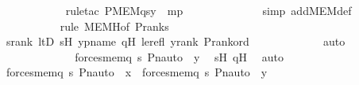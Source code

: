 \begin{isabellebody}
\ \ \ \ \ \ \ \ \ \ \isamarkupfalse%
\ {\isacharparenleft}{\kern0pt}rule{\isacharunderscore}{\kern0pt}tac\ P{\isacharequal}{\kern0pt}{\isachardoublequoteopen}MEM{\isacharparenleft}{\kern0pt}q{\isacharcomma}{\kern0pt}s{\isacharcomma}{\kern0pt}y{\isacharparenright}{\kern0pt}{\isachardoublequoteclose}\ \ mp{\isacharparenright}{\kern0pt}\ \isanewline
\ \ \ \ \ \ \ \ \ \ \ \isamarkupfalse%
\ {\isacharparenleft}{\kern0pt}simp\ add{\isacharcolon}{\kern0pt}MEM{\isacharunderscore}{\kern0pt}def{\isacharparenright}{\kern0pt}\ \isanewline
\ \ \ \ \ \ \ \ \ \ \isamarkupfalse%
{\isacharparenleft}{\kern0pt}rule\ MEMH{\isacharbrackleft}{\kern0pt}of\ {\isachardoublequoteopen}P{\isacharunderscore}{\kern0pt}rank{\isacharparenleft}{\kern0pt}s{\isacharparenright}{\kern0pt}{\isachardoublequoteclose}{\isacharbrackright}{\kern0pt}{\isacharparenright}{\kern0pt}\ \isanewline
\ \ \ \ \ \ \ \ \ \ \isamarkupfalse%
\ srank\ ltD\ sH\ ypname\ qH\ le{\isacharunderscore}{\kern0pt}refl\ yrank\ P{\isacharunderscore}{\kern0pt}rank{\isacharunderscore}{\kern0pt}ord\ \isanewline
\ \ \ \ \ \ \ \ \ \ \isamarkupfalse%
\ auto\ \ \isanewline
\ \ \ \ \ \ \ \ \isamarkupfalse%
\ \isamarkupfalse%
\ {\isachardoublequoteopen}{\isachardot}{\kern0pt}{\isachardot}{\kern0pt}{\isachardot}{\kern0pt}\ {\isasymlongleftrightarrow}\ forces{\isacharunderscore}{\kern0pt}mem{\isacharparenleft}{\kern0pt}q{\isacharprime}{\kern0pt}{\isacharcomma}{\kern0pt}\ s{\isacharprime}{\kern0pt}{\isacharcomma}{\kern0pt}\ Pn{\isacharunderscore}{\kern0pt}auto{\isacharparenleft}{\kern0pt}{\isasympi}{\isacharparenright}{\kern0pt}\ {\isacharbackquote}{\kern0pt}\ y{\isacharparenright}{\kern0pt}{\isachardoublequoteclose}\ \isamarkupfalse%
\ sH\ qH\ \isamarkupfalse%
\ auto\isanewline
\ \ \ \ \ \ \ \ \isamarkupfalse%
\ \isamarkupfalse%
\ {\isachardoublequoteopen}forces{\isacharunderscore}{\kern0pt}mem{\isacharparenleft}{\kern0pt}q{\isacharprime}{\kern0pt}{\isacharcomma}{\kern0pt}\ s{\isacharprime}{\kern0pt}{\isacharcomma}{\kern0pt}\ Pn{\isacharunderscore}{\kern0pt}auto{\isacharparenleft}{\kern0pt}{\isasympi}{\isacharparenright}{\kern0pt}\ {\isacharbackquote}{\kern0pt}\ x{\isacharparenright}{\kern0pt}\ {\isasymlongleftrightarrow}\ forces{\isacharunderscore}{\kern0pt}mem{\isacharparenleft}{\kern0pt}q{\isacharprime}{\kern0pt}{\isacharcomma}{\kern0pt}\ s{\isacharprime}{\kern0pt}{\isacharcomma}{\kern0pt}\ Pn{\isacharunderscore}{\kern0pt}auto{\isacharparenleft}{\kern0pt}{\isasympi}{\isacharparenright}{\kern0pt}\ {\isacharbackquote}{\kern0pt}\ y{\isacharparenright}{\kern0pt}\ {\isachardoublequoteclose}\ \isamarkupfalse%

\end{isabellebody}
